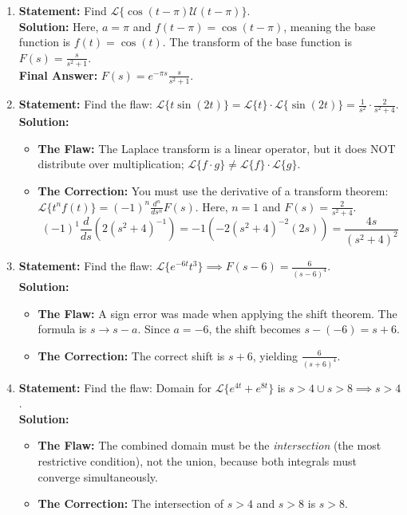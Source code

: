 \documentclass[11pt, letterpaper]{article}
\theoremstyle{definition}
\theoremstyle{remark}
\begin{document}
\begin{enumerate}[label=\textbf{Solution \arabic*.}, leftmargin=*]
    \item \textbf{Statement:} Find $\mathscr{L}\{\cos(t-\pi) \mathcal{U}(t-\pi)\}$.\\
    \textbf{Solution:} Here, $a = \pi$ and $f(t-\pi) = \cos(t-\pi)$, meaning the base function is $f(t) = \cos(t)$. The transform of the base function is $F(s) = \frac{s}{s^2+1}$.\\
    \textbf{Final Answer:} $F(s) = e^{-\pi s} \frac{s}{s^2+1}$.

    \item \textbf{Statement:} Find the flaw: $\mathscr{L}\{t \sin(2t)\} = \mathscr{L}\{t\} \cdot \mathscr{L}\{\sin(2t)\} = \frac{1}{s^2} \cdot \frac{2}{s^2+4}$.\\
    \textbf{Solution:} 
    \begin{itemize}
        \item \textbf{The Flaw:} The Laplace transform is a linear operator, but it does NOT distribute over multiplication; $\mathscr{L}\{f \cdot g\} \neq \mathscr{L}\{f\} \cdot \mathscr{L}\{g\}$.
        \item \textbf{The Correction:} You must use the derivative of a transform theorem: $\mathscr{L}\{t^n f(t)\} = (-1)^n \frac{d^n}{ds^n} F(s)$. Here, $n=1$ and $F(s) = \frac{2}{s^2+4}$.
        \[
        (-1)^1 \frac{d}{ds} \left( 2(s^2+4)^{-1} \right) = -1 \left( -2(s^2+4)^{-2}(2s) \right) = \frac{4s}{(s^2+4)^2}
        \]
    \end{itemize}

    \item \textbf{Statement:} Find the flaw: $\mathscr{L}\{e^{-6t} t^3\} \implies F(s-6) = \frac{6}{(s-6)^4}$.\\
    \textbf{Solution:}
    \begin{itemize}
        \item \textbf{The Flaw:} A sign error was made when applying the shift theorem. The formula is $s \to s - a$. Since $a = -6$, the shift becomes $s - (-6) = s + 6$.
        \item \textbf{The Correction:} The correct shift is $s + 6$, yielding $\frac{6}{(s+6)^4}$.
    \end{itemize}

    \item \textbf{Statement:} Find the flaw: Domain for $\mathscr{L}\{e^{4t} + e^{8t}\}$ is $s > 4 \cup s > 8 \implies s > 4$.\\
    \textbf{Solution:}
    \begin{itemize}
        \item \textbf{The Flaw:} The combined domain must be the \textit{intersection} (the most restrictive condition), not the union, because both integrals must converge simultaneously.
        \item \textbf{The Correction:} The intersection of $s > 4$ and $s > 8$ is $s > 8$.
    \end{itemize}


\end{enumerate}
\end{document}
